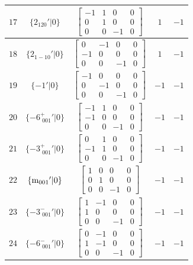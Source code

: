 \documentclass[fleqn,8pt]{jsarticle}
\begin{document}
\begin{longtable}{ccccc}
$ 17 $ & $ \{2{}_{120}{}'|0\} $ & $ \begin{bmatrix} -1 & 1 & 0 & 0 \\ 0 & 1 & 0 & 0 \\ 0 & 0 & -1 & 0 \end{bmatrix} $ & $ 1 $ & $ -1 $ \\ \hline
$ 18 $ & $ \{2{}_{1-10}{}'|0\} $ & $ \begin{bmatrix} 0 & -1 & 0 & 0 \\ -1 & 0 & 0 & 0 \\ 0 & 0 & -1 & 0 \end{bmatrix} $ & $ 1 $ & $ -1 $ \\ \hline
$ 19 $ & $ \{-1{}'|0\} $ & $ \begin{bmatrix} -1 & 0 & 0 & 0 \\ 0 & -1 & 0 & 0 \\ 0 & 0 & -1 & 0 \end{bmatrix} $ & $ -1 $ & $ -1 $ \\ \hline
$ 20 $ & $ \{-6^{+}_{\,\,001}{}'|0\} $ & $ \begin{bmatrix} -1 & 1 & 0 & 0 \\ -1 & 0 & 0 & 0 \\ 0 & 0 & -1 & 0 \end{bmatrix} $ & $ -1 $ & $ -1 $ \\ \hline
$ 21 $ & $ \{-3^{+}_{\,\,001}{}'|0\} $ & $ \begin{bmatrix} 0 & 1 & 0 & 0 \\ -1 & 1 & 0 & 0 \\ 0 & 0 & -1 & 0 \end{bmatrix} $ & $ -1 $ & $ -1 $ \\ \hline
$ 22 $ & $ \{{\rm m}_{001}{}'|0\} $ & $ \begin{bmatrix} 1 & 0 & 0 & 0 \\ 0 & 1 & 0 & 0 \\ 0 & 0 & -1 & 0 \end{bmatrix} $ & $ -1 $ & $ -1 $ \\ \hline
$ 23 $ & $ \{-3^{-}_{\,\,001}{}'|0\} $ & $ \begin{bmatrix} 1 & -1 & 0 & 0 \\ 1 & 0 & 0 & 0 \\ 0 & 0 & -1 & 0 \end{bmatrix} $ & $ -1 $ & $ -1 $ \\ \hline
$ 24 $ & $ \{-6^{-}_{\,\,001}{}'|0\} $ & $ \begin{bmatrix} 0 & -1 & 0 & 0 \\ 1 & -1 & 0 & 0 \\ 0 & 0 & -1 & 0 \end{bmatrix} $ & $ -1 $ & $ -1 $ \\
\end{longtable}
\end{document}

